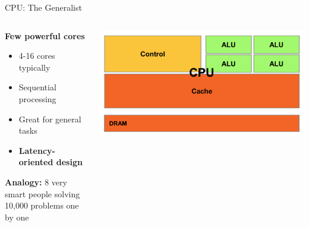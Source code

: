 \documentclass[10pt]{beamer}
\begin{document}
\begin{frame}{CPU: The Generalist}
  \begin{columns}[T]
    \begin{column}{0.5\textwidth}
      \textbf{Few powerful cores}
      \begin{itemize}
        \item 4-16 cores typically
        \item Sequential processing
        \item Great for general tasks
        \item \textbf{Latency-oriented design}
      \end{itemize}
      
      \vspace{1em}
      \textbf{Analogy:} 8 very smart people solving 10,000 problems one by one
    \end{column}
    \begin{column}{0.5\textwidth}
      \begin{center}
        \includegraphics[width=\textwidth,height=0.6\textheight,keepaspectratio]{images/cpu_arch.png}
      \end{center}
    \end{column}
  \end{columns}
\end{frame}
\end{document}
